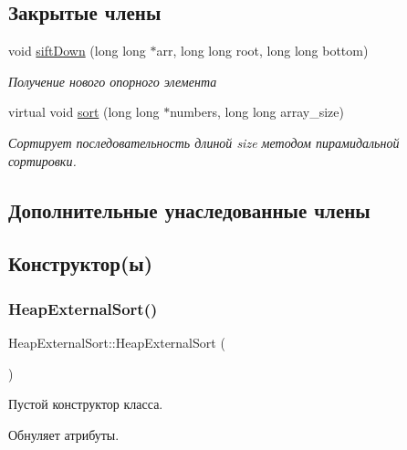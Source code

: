 \subsection*{Закрытые члены}
\begin{DoxyCompactItemize}
\item 
void \hyperlink{class_heap_external_sort_af476431c6fafd53c40ab306c97a37134}{sift\+Down} (long long $\ast$arr, long long root, long long bottom)
\begin{DoxyCompactList}\small\item\em Получение нового опорного элемента \end{DoxyCompactList}\item 
virtual void \hyperlink{class_heap_external_sort_a908087ce13932b268a35e1184a05ea44}{sort} (long long $\ast$numbers, long long array\+\_\+size)
\begin{DoxyCompactList}\small\item\em Сортирует последовательность длиной size методом пирамидальной сортировки. \end{DoxyCompactList}\end{DoxyCompactItemize}
\subsection*{Дополнительные унаследованные члены}


\subsection{Конструктор(ы)}
\hypertarget{class_heap_external_sort_a9e6236e47430f0b530b287a6d7cf3a8b}{}\label{class_heap_external_sort_a9e6236e47430f0b530b287a6d7cf3a8b} 
\subsubsection{\texorpdfstring{Heap\+External\+Sort()}{HeapExternalSort()}}
{\footnotesize\ttfamily Heap\+External\+Sort\+::\+Heap\+External\+Sort (\begin{DoxyParamCaption}{ }\end{DoxyParamCaption})}



Пустой конструктор класса. 

Обнуляет атрибуты. \hypertarget{class_heap_external_sort_afa76473510a8cb610bb94bca5b5202c9}{}\label{class_heap_external_sort_afa76473510a8cb610bb94bca5b5202c9} 

